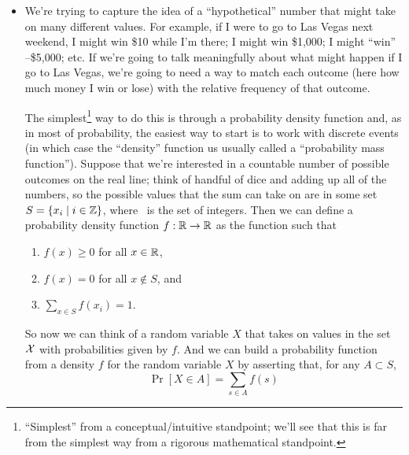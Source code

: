\begin{itemize}[leftmargin=0pt]

\item We're trying to capture the idea of a ``hypothetical'' number
  that might take on many different values.  For example, if I were to
  go to Las Vegas next weekend, I might win \$10 while I'm there; I
  might win \$1,000; I might ``win'' --\$5,000; etc.  If we're going
  to talk meaningfully about what might happen if I go to Las Vegas,
  we're going to need a way to match each outcome (here how much money
  I win or lose) with the relative frequency of that outcome.

  The simplest\footnote{``Simplest'' from a conceptual/intuitive
  standpoint; we'll see that this is far from the simplest way from
  a rigorous mathematical standpoint.}  way to do this is through a
  probability density function and, as in most of probability, the
  easiest way to start is to work with discrete events (in which case
  the ``density'' function us usually called a ``probability mass
  function'').  Suppose that we're interested in a countable number of
  possible outcomes on the real line; think of handful of dice and
  adding up all of the numbers, so the possible values that the sum
  can take on are in some set $S = \{x_i \mid i \in \mathbb{Z}\}$, where \ZZ\ is
  the set of integers.  Then we can define a probability density
  function $f: \mathbb{R} \to \mathbb{R}$ as the function such that
  \begin{enumerate}
  \item $f(x) \geq 0$ for all $x \in \mathbb{R}$,
  \item $f(x) = 0$ for all $x \notin S$, and
  \item $\sum_{x \in S} f(x_i) = 1$.
  \end{enumerate}

  So now we can think of a random variable $X$ that takes on values in
  the set $\mathcal{X}$ with probabilities given by $f$.  And we can
  build a probability function from a density $f$ for the random
  variable $X$ by asserting that, for any $A \subset S$,
  \begin{equation*}
    \Pr[ X \in A ] = \sum_{s \in A} f(s)
  \end{equation*}


\end{itemize}
